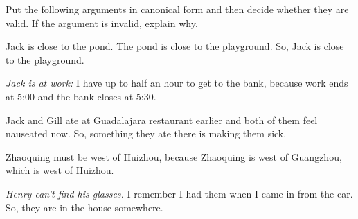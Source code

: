 \noindent\problempart Put the following arguments in canonical form and then decide whether they are valid. If the argument is invalid, explain why.

\begin{exercises}
\item Jack is close to the pond. The pond is close to the playground. So, Jack is close to the playground.

\item \textit{Jack is at work: }I have up to half an hour to get to the bank, because work ends at 5:00 and the bank closes at 5:30. 

\item Jack and Gill ate at Guadalajara restaurant earlier and both of them feel nauseated now. So, something they ate there is making them sick.

\item Zhaoquing must be west of Huizhou, because Zhaoquing is west of Guangzhou, which is west of Huizhou. 
%
\item \textit{Henry can't find his glasses. }I remember I had them when I came in from the car. So, they are in the house somewhere.


\end{exercises}
